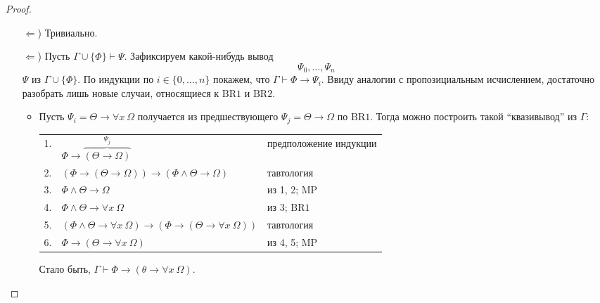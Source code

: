 \documentclass[12pt,a4paper]{article}
\begin{document}
    \begin{proof}
        \begin{itemize}
            \item[$\Leftarrow$)] Тривиально.
            \item[$\Leftarrow$)] Пусть $\Gamma \cup \{\Phi\} \vdash \Psi$. Зафиксируем какой-нибудь вывод
                \[\Psi_0, \dots, \Psi_n\]
                $\Psi$ из $\Gamma \cup \{\Phi\}$. По индукции по $i \in \{0, \dots, n\}$ покажем, что $\Gamma \vdash \Phi \rightarrow \Psi_i$. Ввиду аналогии с пропозициальным исчислением, достаточно разобрать лишь новые случаи, относящиеся к $\mathrm{BR1}$ и $\mathrm{BR2}$.
                \begin{itemize}
                    \item Пусть $\Psi_i = \Theta \rightarrow \forall x\ \Omega$ получается из предшествующего $\Psi_j = \Theta \rightarrow \Omega$ по $\mathrm{BR1}$. Тогда можно построить такой ``квазивывод'' из $\Gamma$:
                        \begin{center}
                            \begin{tabular}{rll}
                                1.& $\Phi \rightarrow \overbrace{(\Theta \rightarrow \Omega)}^{\Psi_j}$& предположение индукции\\
                                2.& $(\Phi \rightarrow (\Theta \rightarrow \Omega)) \rightarrow (\Phi \wedge \Theta \rightarrow \Omega)$& тавтология\\
                                3.& $\Phi \wedge \Theta \rightarrow \Omega$& из 1, 2; $\mathrm{MP}$\\
                                4.& $\Phi \wedge \Theta \rightarrow \forall x\ \Omega$& из 3; $\mathrm{BR1}$\\
                                5.& $(\Phi \wedge \Theta \rightarrow \forall x\ \Omega) \rightarrow (\Phi \rightarrow (\Theta \rightarrow \forall x\ \Omega))$& тавтология\\
                                6.& $\Phi \rightarrow (\Theta \rightarrow \forall x\ \Omega)$& из 4, 5; $\mathrm{MP}$\\
                            \end{tabular}
                        \end{center}
                        Стало быть, $\Gamma \vdash \Phi \rightarrow (\theta \rightarrow \forall x\ \Omega)$.
                    

\end{itemize}
\end{itemize}
\end{proof}
\end{document}
